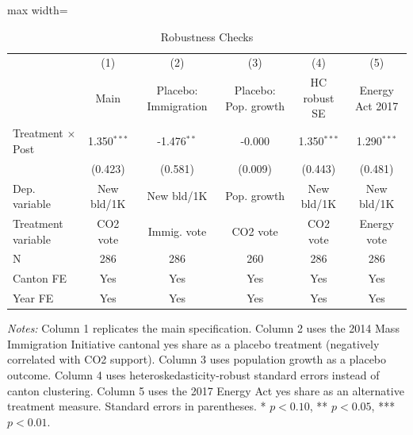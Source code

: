\begin{table}[H]
\centering
\caption{Robustness Checks}
\begin{adjustbox}{max width=\textwidth}
\begin{threeparttable}
\begin{tabular}{lccccc}
\toprule
& (1) & (2) & (3) & (4) & (5) \\
& Main & Placebo: Immigration & Placebo: Pop. growth & HC robust SE & Energy Act 2017 \\
\midrule
Treatment $\times$ Post & 1.350$^{***}$ & -1.476$^{**}$ & -0.000 & 1.350$^{***}$ & 1.290$^{***}$ \\
& (0.423) & (0.581) & (0.009) & (0.443) & (0.481) \\
\midrule
Dep. variable & New bld/1K & New bld/1K & Pop. growth & New bld/1K & New bld/1K \\
Treatment variable & CO2 vote & Immig. vote & CO2 vote & CO2 vote & Energy vote \\
N & 286 & 286 & 260 & 286 & 286 \\
Canton FE & Yes & Yes & Yes & Yes & Yes \\
Year FE & Yes & Yes & Yes & Yes & Yes \\
\bottomrule
\end{tabular}
\begin{tablenotes}[flushleft]
\small
\item \textit{Notes:} Column 1 replicates the main specification. Column 2 uses the 2014 Mass Immigration Initiative cantonal yes share as a placebo treatment (negatively correlated with CO2 support). Column 3 uses population growth as a placebo outcome. Column 4 uses heteroskedasticity-robust standard errors instead of canton clustering. Column 5 uses the 2017 Energy Act yes share as an alternative treatment measure. Standard errors in parentheses. * $p<0.10$, ** $p<0.05$, *** $p<0.01$.
\end{tablenotes}
\end{threeparttable}
\end{adjustbox}
\label{tab:robustness}
\end{table}

